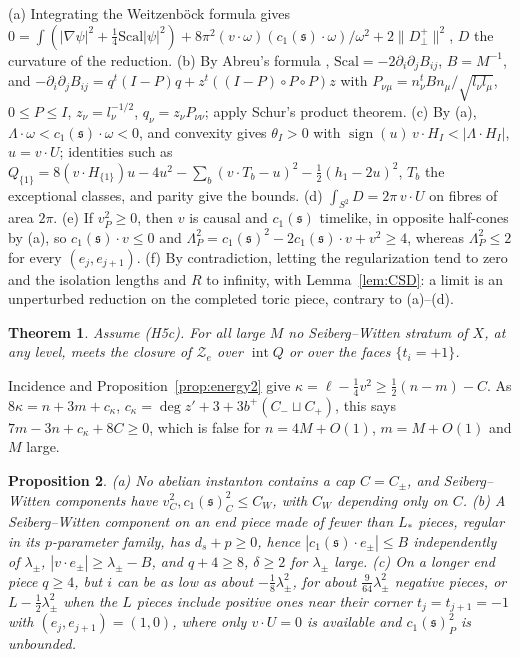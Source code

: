 \documentclass[10pt]{amsart}
\makeatletter
\numberwithin{equation}{section}
\theoremstyle{compact}
\newtheorem{theorem}{Theorem}[section]
\newtheorem{proposition}[theorem]{Proposition}
\renewenvironment{proof}[1][\proofname]{\par\pushQED{\qed}\normalfont
  \topsep4\p@\relax\trivlist\item[\hskip\labelsep\itshape#1\@addpunct{.}]%
  \ignorespaces}{\popQED\endtrivlist\@endpefalse}
\newcommand{\fs}{\mathfrak s}
\newcommand{\cZ}{\mathcal Z}
\makeatother
\begin{document}
\begin{proof}[Sketch]
(a) Integrating the Weitzenböck formula gives $0=\int(|\nabla\psi|^2+\frac14
\mathrm{Scal}|\psi|^2)+8\pi^2(v\cdot\omega)(c_1(\fs)\cdot\omega)/\omega^2+
2\|D^+_\perp\|^2$, $D$ the curvature of the reduction. (b) By Abreu's formula
\cite{Ab}, $\mathrm{Scal}=-2\partial_i\partial_jB_{ij}$, $B=M^{-1}$, and
$-\partial_i\partial_jB_{ij}=q^t(I-P)q+z^t((I-P)\circ P\circ P)z$ with
$P_{\nu\mu}=n_\nu^tBn_\mu/\sqrt{l_\nu l_\mu}$, $0\le P\le I$,
$z_\nu=l_\nu^{-1/2}$, $q_\nu=z_\nu P_{\nu\nu}$; apply Schur's product theorem.
(c) By (a), $\Lambda\cdot\omega<c_1(\fs)\cdot\omega<0$, and convexity gives
$\theta_I>0$ with $\operatorname{sign}(u)\,v\cdot H_I<|\Lambda\cdot H_I|$,
$u=v\cdot U$; identities such as
$Q_{\{1\}}=8(v\cdot H_{\{1\}})u-4u^2-\sum_b(v\cdot T_b-u)^2-\frac12(h_1-2u)^2$,
$T_b$ the exceptional classes, and parity give the bounds. (d)
$\int_{S^2}D=2\pi\,v\cdot U$ on fibres of area $2\pi$. (e) If $v_P^2\ge0$, then
$v$ is causal and $c_1(\fs)$ timelike, in opposite half-cones by (a), so
$c_1(\fs)\cdot v\le0$ and $\Lambda_P^2=c_1(\fs)^2-2c_1(\fs)\cdot v+v^2\ge4$,
whereas $\Lambda_P^2\le2$ for every $(e_j,e_{j+1})$. (f) By contradiction,
letting the regularization tend to zero and the isolation lengths and $R$ to
infinity, with Lemma~\ref{lem:CSD}: a limit is an unperturbed reduction on the
completed toric piece, contrary to (a)--(d).
\end{proof}

\begin{theorem}\label{thm:unbroken}
Assume \textup{(H5c)}. For all large $M$ no Seiberg--Witten stratum of $X$, at
any level, meets the closure of $\cZ_e$ over $\operatorname{int}Q$ or over the
faces $\{t_i=+1\}$.
\end{theorem}

\begin{proof}
Incidence and Proposition~\ref{prop:energy2} give $\kappa=\ell-\frac14v^2\ge
\frac12(n-m)-C$. As $8\kappa=n+3m+c_\kappa$, $c_\kappa=\deg z'+3+3b^+(C_-\sqcup
C_+)$, this says $7m-3n+c_\kappa+8C\ge0$, which is false for $n=4M+O(1)$,
$m=M+O(1)$ and $M$ large.
\end{proof}

\begin{proposition}\label{prop:caps}
\textup{(a)} No abelian instanton contains a cap $C=C_\pm$, and Seiberg--Witten
components have $v_C^2,c_1(\fs)_C^2\le C_W$, with $C_W$ depending only on $C$.
\textup{(b)} A Seiberg--Witten component on an end piece made of fewer than
$L_*$ pieces, regular in its $p$-parameter family, has $d_s+p\ge0$, hence
$|c_1(\fs)\cdot e_\pm|\le B$ independently of $\lambda_\pm$, $|v\cdot
e_\pm|\ge\lambda_\pm-B$, and $q+4\ge8$, $\delta\ge2$ for $\lambda_\pm$ large.
\textup{(c)} On a longer end piece $q\ge4$, but $i$ can be as low as about
$-\frac18\lambda_\pm^2$, for about $\frac9{64}\lambda_\pm^2$ negative pieces, or
$L-\frac12\lambda_\pm^2$ when the $L$ pieces include positive ones near their
corner $t_j=t_{j+1}=-1$ with $(e_j,e_{j+1})=(1,0)$, where only $v\cdot U=0$ is
available and $c_1(\fs)_P^2$ is unbounded.
\end{proposition}
\end{document}
